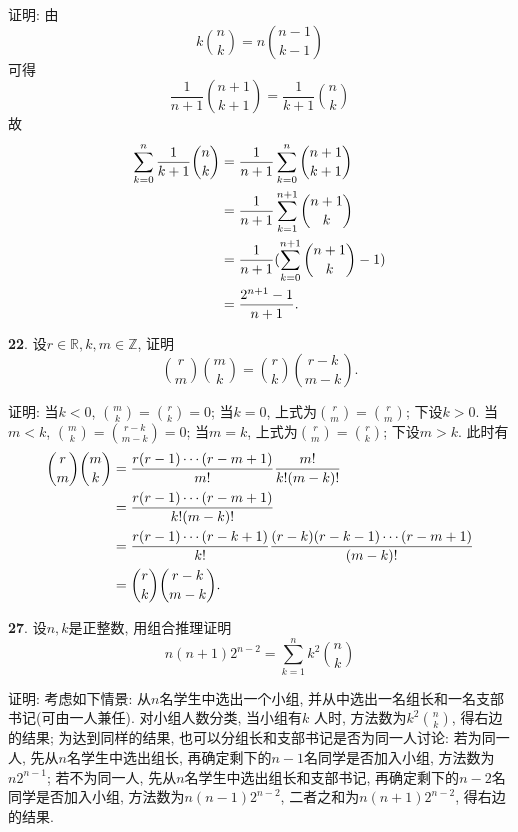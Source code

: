 \documentclass[12pt,a4paper]{article}
\begin{document}
\begin{CJK*}{GBK}{song}
\par 证明: 由
\begin{displaymath}
k\binom{n}{k}=n\binom{n-1}{k-1}
\end{displaymath}
可得
\begin{displaymath}
\frac{1}{n+1}\binom{n+1}{k+1}=\frac{1}{k+1}\binom{n}{k}
\end{displaymath}
故
\begin{align*}
\sum_{k=0}^n \frac{1}{k+1}\binom{n}{k}
&=\frac{1}{n+1}\sum^{n}_{k=0}\binom{n+1}{k+1}\notag\\
&=\frac{1}{n+1}\sum^{n+1}_{k=1}\binom{n+1}{k}\notag\\
&=\frac{1}{n+1}(\sum^{n+1}_{k=0}\binom{n+1}{k}-1)\notag\\
&=\frac{2^{n+1}-1}{n+1}. \notag
\end{align*}

\par \textbf{22}. 设$r\in\mathbb{R},k,m\in\mathbb{Z}$, 证明
\begin{displaymath}
\binom{r}{m}\binom{m}{k}=\binom{r}{k}\binom{r-k}{m-k}.
\end{displaymath}
\par 证明: 当$k<0$, $\binom{m}{k}=\binom{r}{k}=0$;
当$k=0$, 上式为$\binom{r}{m}=\binom{r}{m}$; 下设$k>0$.
当$m<k$, $\binom{m}{k}=\binom{r-k}{m-k}=0$;
当$m=k$, 上式为$\binom{r}{m}=\binom{r}{k}$; 下设$m>k$.
此时有
\begin{align*}
\binom{r}{m}\binom{m}{k}
&=\frac{r(r-1)\cdots(r-m+1)}{m!}\frac{m!}{k!(m-k)!}\notag\\
&=\frac{r(r-1)\cdots(r-m+1)}{k!(m-k)!}\notag\\
&=\frac{r(r-1)\cdots(r-k+1)}{k!}\frac{(r-k)(r-k-1)\cdots(r-m+1)}{(m-k)!}\notag\\
&=\binom{r}{k}\binom{r-k}{m-k}. \notag
\end{align*}

\par \textbf{27}. 设$n,k$是正整数, 用组合推理证明
\begin{displaymath}
n(n+1)2^{n-2}=\sum_{k=1}^n k^2\binom{n}{k}
\end{displaymath}
\par 证明: 考虑如下情景: 从$n$名学生中选出一个小组, 并从中选出一名组长和一名支部书记(可由一人兼任). 对小组人数分类, 当小组有$k$ 人时, 方法数为$k^2\binom{n}{k}$, 得右边的结果; 为达到同样的结果, 也可以分组长和支部书记是否为同一人讨论: 若为同一人, 先从$n$名学生中选出组长, 再确定剩下的$n-1$名同学是否加入小组, 方法数为$n2^{n-1}$; 若不为同一人, 先从$n$名学生中选出组长和支部书记, 再确定剩下的$n-2$名同学是否加入小组, 方法数为$n(n-1)2^{n-2}$, 二者之和为$n(n+1)2^{n-2}$, 得右边的结果.


\end{CJK*}
\end{document}
